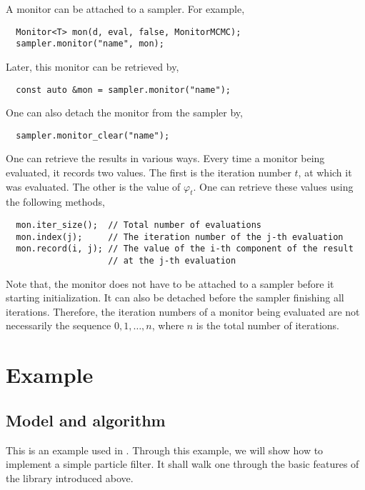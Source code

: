 A monitor can be attached to a sampler. For example,
\begin{Verbatim}
  Monitor<T> mon(d, eval, false, MonitorMCMC);
  sampler.monitor("name", mon);
\end{Verbatim}
Later, this monitor can be retrieved by,
\begin{Verbatim}
  const auto &mon = sampler.monitor("name");
\end{Verbatim}
One can also detach the monitor from the sampler by,
\begin{Verbatim}
  sampler.monitor_clear("name");
\end{Verbatim}
One can retrieve the results in various ways. Every time a monitor being
evaluated, it records two values. The first is the iteration number $t$, at
which it was evaluated. The other is the value of $\varphi_t$. One can retrieve
these values using the following methods,
\begin{Verbatim}
  mon.iter_size();  // Total number of evaluations
  mon.index(j);     // The iteration number of the j-th evaluation
  mon.record(i, j); // The value of the i-th component of the result
                    // at the j-th evaluation
\end{Verbatim}
Note that, the monitor does not have to be attached to a sampler before it
starting initialization. It can also be detached before the sampler finishing
all iterations. Therefore, the iteration numbers of a monitor being evaluated
are not necessarily the sequence $0,1,\dots,n$, where $n$ is the total number
of iterations.

\section{Example}
\label{sec:Example (Core concepts)}

\subsection{Model and algorithm}
\label{sub:Model and algorithm}

This is an example used in \textcite{Johansen:2009wd}. Through this example, we
will show how to implement a simple particle filter. It shall walk one through
the basic features of the library introduced above.

